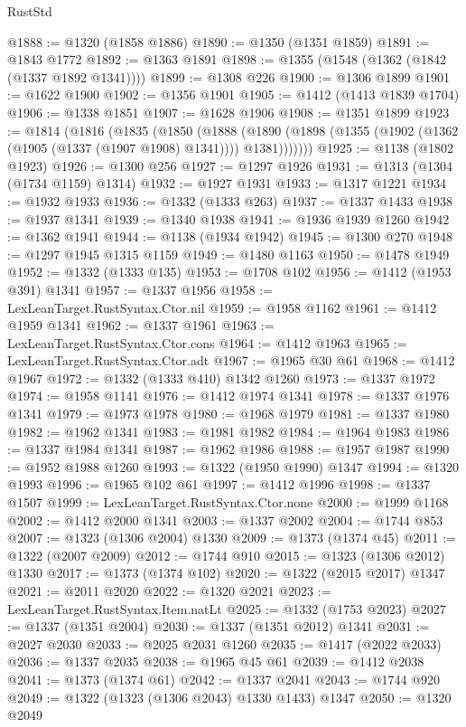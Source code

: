 \begin{lexlean}{RustStd}
\begin{coremodule}
@1888 := @1320 (@1858 @1886)
@1890 := @1350 (@1351 @1859)
@1891 := @1843 @1772
@1892 := @1363 @1891
@1898 := @1355 (@1548 (@1362 (@1842 (@1337 @1892 @1341))))
@1899 := @1308 @226
@1900 := @1306 @1899
@1901 := @1622 @1900
@1902 := @1356 @1901
@1905 := @1412 (@1413 @1839 @1704)
@1906 := @1338 @1851
@1907 := @1628 @1906
@1908 := @1351 @1899
@1923 := @1814
    (@1816
      (@1835
        (@1850
          (@1888
            (@1890 (@1898 (@1355 (@1902 (@1362 (@1905 (@1337 (@1907 @1908) @1341)))) @1381)))))))
@1925 := @1138 (@1802 @1923)
@1926 := @1300 @256
@1927 := @1297 @1926
@1931 := @1313 (@1304 (@1734 @1159) @1314)
@1932 := @1927 @1931
@1933 := @1317 @1221
@1934 := @1932 @1933
@1936 := @1332 (@1333 @263)
@1937 := @1337 @1433
@1938 := @1937 @1341
@1939 := @1340 @1938
@1941 := @1936 @1939 @1260
@1942 := @1362 @1941
@1944 := @1138 (@1934 @1942)
@1945 := @1300 @270
@1948 := @1297 @1945 @1315 @1159
@1949 := @1480 @1163
@1950 := @1478 @1949
@1952 := @1332 (@1333 @135)
@1953 := @1708 @102
@1956 := @1412 (@1953 @391) @1341
@1957 := @1337 @1956
@1958 := LexLeanTarget.RustSyntax.Ctor.nil
@1959 := @1958 @1162
@1961 := @1412 @1959 @1341
@1962 := @1337 @1961
@1963 := LexLeanTarget.RustSyntax.Ctor.cons
@1964 := @1412 @1963
@1965 := LexLeanTarget.RustSyntax.Ctor.adt
@1967 := @1965 @30 @61
@1968 := @1412 @1967
@1972 := @1332 (@1333 @410) @1342 @1260
@1973 := @1337 @1972
@1974 := @1958 @1141
@1976 := @1412 @1974 @1341
@1978 := @1337 @1976 @1341
@1979 := @1973 @1978
@1980 := @1968 @1979
@1981 := @1337 @1980
@1982 := @1962 @1341
@1983 := @1981 @1982
@1984 := @1964 @1983
@1986 := @1337 @1984 @1341
@1987 := @1962 @1986
@1988 := @1957 @1987
@1990 := @1952 @1988 @1260
@1993 := @1322 (@1950 @1990) @1347
@1994 := @1320 @1993
@1996 := @1965 @102 @61
@1997 := @1412 @1996
@1998 := @1337 @1507
@1999 := LexLeanTarget.RustSyntax.Ctor.none
@2000 := @1999 @1168
@2002 := @1412 @2000 @1341
@2003 := @1337 @2002
@2004 := @1744 @853
@2007 := @1323 (@1306 @2004) @1330
@2009 := @1373 (@1374 @45)
@2011 := @1322 (@2007 @2009)
@2012 := @1744 @910
@2015 := @1323 (@1306 @2012) @1330
@2017 := @1373 (@1374 @102)
@2020 := @1322 (@2015 @2017) @1347
@2021 := @2011 @2020
@2022 := @1320 @2021
@2023 := LexLeanTarget.RustSyntax.Item.natLt
@2025 := @1332 (@1753 @2023)
@2027 := @1337 (@1351 @2004)
@2030 := @1337 (@1351 @2012) @1341
@2031 := @2027 @2030
@2033 := @2025 @2031 @1260
@2035 := @1417 (@2022 @2033)
@2036 := @1337 @2035
@2038 := @1965 @45 @61
@2039 := @1412 @2038
@2041 := @1373 (@1374 @61)
@2042 := @1337 @2041
@2043 := @1744 @920
@2049 := @1322 (@1323 (@1306 @2043) @1330 @1433) @1347
@2050 := @1320 @2049

\end{coremodule}
\end{lexlean}
